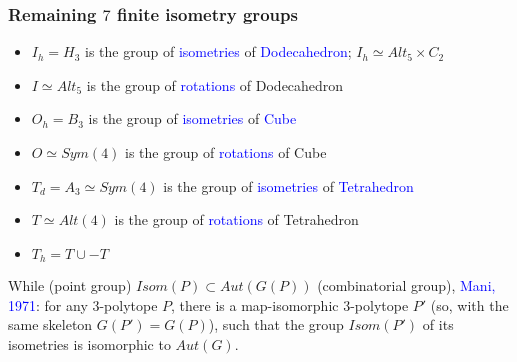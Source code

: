 \documentclass{beamer}
\begin{document}
\begin{frame}\frametitle{Remaining $7$ finite isometry groups}
\vspace{-1mm}
\begin{itemize} 
\item $I_h=H_3$ is the group of
\textcolor{blue}{isometries} of \textcolor{blue}{Dodecahedron};
$I_h\simeq Alt_5\times C_2$ 
\item $I\simeq Alt_5$ is the group of \textcolor{blue}{rotations} of 
Dodecahedron
\item $O_h=B_3$ is the group of \textcolor{blue}{isometries} of 
\textcolor{blue}{Cube}
\item $O\simeq Sym(4)$ is the group of \textcolor{blue}{rotations} of Cube
\item $T_d=A_3\simeq Sym(4)$ is the group of \textcolor{blue}{isometries}
of  \textcolor{blue}{Tetrahedron}
\item $T\simeq Alt(4)$ is the group of \textcolor{blue}{rotations} of Tetrahedron
\item $T_h=T\cup -T$
\end{itemize}
\vspace{1.5mm}

While 
(point group) $Isom(P)\subset Aut(G(P))$ (combinatorial group),
\textcolor{blue}{Mani, 1971}:
for any  $3$-polytope $P$, there is a map-isomorphic $3$-polytope $P'$ 
(so, with the same 
skeleton $G(P')=G(P)$), such that the    
group $Isom(P')$ of its isometries  is isomorphic to $Aut(G)$.
\end{frame}
\end{document}
